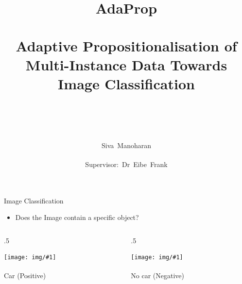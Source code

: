 \documentclass{beamer}
\title{ 
    ~\\~\\ 
    {\huge AdaProp} 
    \\~\\
    {\large Adaptive Propositionalisation of Multi-Instance Data Towards Image Classification}
    \\~
}
\author{~\\~\\Siva~Manoharan\\~\\Supervisor:~Dr~Eibe~Frank}
\date{} %
\newcommand{\ImageAndCaptionColumn}[2]{%
    \begin{column}{.5\textwidth}
        \begin{center} 
            \texttt{[image: img/\#1]} \\~\\ 
            {\Large #2}
        \end{center} 
    \end{column}
}
\newcommand{\TextAndTwoImageFrame}[5]{%
    \vspace{-0.5cm}    
    
    \begin{itemize}
        \item #1
    \end{itemize}
    
    \vspace{-0.5cm} %
    
    \begin{columns}[T]
        \ImageAndCaptionColumn{#2}{#3}
        \ImageAndCaptionColumn{#4}{#5}
    \end{columns}
}
\begin{document}
{
    \makeatletter
        \def\beamer@entrycode{\vspace*{-0.8\headheight}}
    \makeatother

    \begin{frame}
        \titlepage
    \end{frame}
}

\begin{frame}{Image Classification}


    \TextAndTwoImageFrame{
    	Does the Image contain a specific object?
    }{cars1}{Car (Positive)}{none1}{No car (Negative)}
    
\end{frame}
\end{document}
